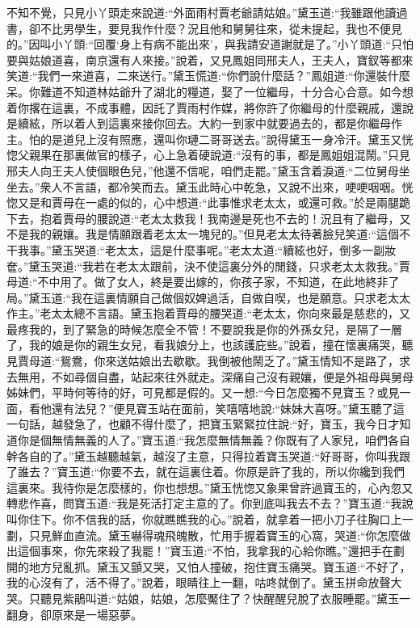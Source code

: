 \begin{parag}
    不知不覺，只見小丫頭走來說道:“外面雨村賈老爺請姑娘。”黛玉道:“我雖跟他讀過書，卻不比男學生，要見我作什麼？況且他和舅舅往來，從未提起，我也不便見的。”因叫小丫頭:“回覆‘身上有病不能出來’，與我請安道謝就是了。”小丫頭道:“只怕要與姑娘道喜，南京還有人來接。”說着，又見鳳姐同邢夫人，王夫人，寶釵等都來笑道:“我們一來道喜，二來送行。”黛玉慌道:“你們說什麼話？”鳳姐道:“你還裝什麼呆。你難道不知道林姑爺升了湖北的糧道，娶了一位繼母，十分合心合意。如今想着你撂在這裏，不成事體，因託了賈雨村作媒，將你許了你繼母的什麼親戚，還說是續絃，所以着人到這裏來接你回去。大約一到家中就要過去的，都是你繼母作主。怕的是道兒上沒有照應，還叫你璉二哥哥送去。”說得黛玉一身冷汗。黛玉又恍惚父親果在那裏做官的樣子，心上急着硬說道:“沒有的事，都是鳳姐姐混鬧。”只見邢夫人向王夫人使個眼色兒，”他還不信呢，咱們走罷。”黛玉含着淚道:“二位舅母坐坐去。”衆人不言語，都冷笑而去。黛玉此時心中乾急，又說不出來，哽哽咽咽。恍惚又是和賈母在一處的似的，心中想道:“此事惟求老太太，或還可救。”於是兩腿跪下去，抱着賈母的腰說道:“老太太救我！我南邊是死也不去的！況且有了繼母，又不是我的親孃。我是情願跟着老太太一塊兒的。”但見老太太待著臉兒笑道:“這個不干我事。”黛玉哭道:“老太太，這是什麼事呢。”老太太道:“續絃也好，倒多一副妝奩。”黛玉哭道:“我若在老太太跟前，決不使這裏分外的閒錢，只求老太太救我。”賈母道:“不中用了。做了女人，終是要出嫁的，你孩子家，不知道，在此地終非了局。”黛玉道:“我在這裏情願自己做個奴婢過活，自做自喫，也是願意。只求老太太作主。”老太太總不言語。黛玉抱着賈母的腰哭道:“老太太，你向來最是慈悲的，又最疼我的，到了緊急的時候怎麼全不管！不要說我是你的外孫女兒，是隔了一層了，我的娘是你的親生女兒，看我娘分上，也該護庇些。”說着，撞在懷裏痛哭，聽見賈母道:“鴛鴦，你來送姑娘出去歇歇。我倒被他鬧乏了。”黛玉情知不是路了，求去無用，不如尋個自盡，站起來往外就走。深痛自己沒有親孃，便是外祖母與舅母姊妹們，平時何等待的好，可見都是假的。又一想:“今日怎麼獨不見寶玉？或見一面，看他還有法兒？”便見寶玉站在面前，笑嘻嘻地說:“妹妹大喜呀。”黛玉聽了這一句話，越發急了，也顧不得什麼了，把寶玉緊緊拉住說:“好，寶玉，我今日才知道你是個無情無義的人了。”寶玉道:“我怎麼無情無義？你既有了人家兒，咱們各自幹各自的了。”黛玉越聽越氣，越沒了主意，只得拉着寶玉哭道:“好哥哥，你叫我跟了誰去？”寶玉道:“你要不去，就在這裏住着。你原是許了我的，所以你纔到我們這裏來。我待你是怎麼樣的，你也想想。”黛玉恍惚又象果曾許過寶玉的，心內忽又轉悲作喜，問寶玉道:“我是死活打定主意的了。你到底叫我去不去？”寶玉道:“我說叫你住下。你不信我的話，你就瞧瞧我的心。”說着，就拿着一把小刀子往胸口上一劃，只見鮮血直流。黛玉嚇得魂飛魄散，忙用手握着寶玉的心窩，哭道:“你怎麼做出這個事來，你先來殺了我罷！”寶玉道:“不怕，我拿我的心給你瞧。”還把手在劃開的地方兒亂抓。黛玉又顫又哭，又怕人撞破，抱住寶玉痛哭。寶玉道:“不好了，我的心沒有了，活不得了。”說着，眼睛往上一翻，咕咚就倒了。黛玉拼命放聲大哭。只聽見紫鵑叫道:“姑娘，姑娘，怎麼魘住了？快醒醒兒脫了衣服睡罷。”黛玉一翻身，卻原來是一場惡夢。
\end{parag}


